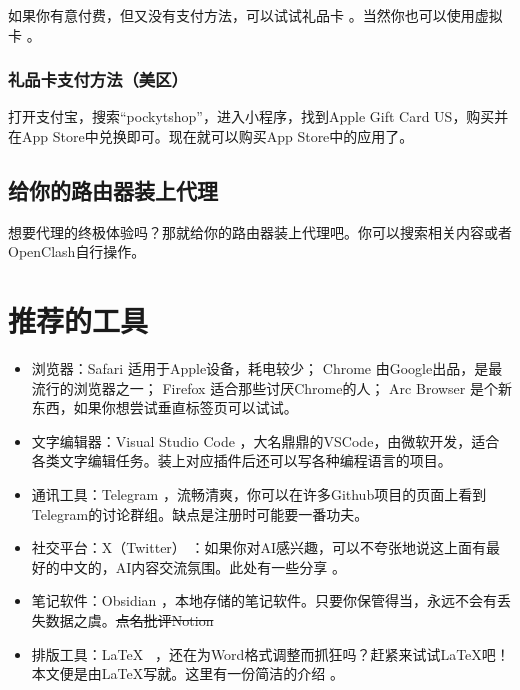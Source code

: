 如果你有意付费，但又没有支付方法，可以试试礼品卡 \hyperlink{gift-card}{} 。当然你也可以使用虚拟卡 \hyperlink{card}{} 。
\hypertarget{gift-card}{\subsubsection*{礼品卡支付方法（美区）}}
打开支付宝，搜索“\textsf{pockytshop}”，进入小程序，找到\textsf{Apple Gift Card US}，购买并在\textsf{App Store}中兑换即可。现在就可以购买\textsf{App Store}中的应用了。

\subsection{给你的路由器装上代理}
想要代理的终极体验吗？那就给你的路由器装上代理吧。你可以搜索相关内容或者\textsf{OpenClash}自行操作。

\section{推荐的工具}
\begin{itemize}
    \item 浏览器：\textsf{Safari} \href{https://www.apple.com/safari/}{\color{black}\faLink} 适用于\textsf{Apple}设备，耗电较少；
    \textsf{Chrome} \href{https://www.google.com/chrome/}{\color{black}\faLink} 由\textsf{Google}出品，是最流行的浏览器之一；
    \textsf{Firefox} \href{https://www.mozilla.org/en-US/firefox/}{\color{black}\faLink} 适合那些讨厌\textsf{Chrome}的人；
    \textsf{Arc Browser} \href{https://arc.net}{\color{black}\faLink} 是个新东西，如果你想尝试垂直标签页可以试试。
    \item 文字编辑器：\textsf{Visual Studio Code} \href{https://code.visualstudio.com}{\color{black}\faLink} ，大名鼎鼎的\textsf{VSCode}，由微软开发，适合各类文字编辑任务。装上对应插件后还可以写各种编程语言的项目。
    \item 通讯工具：\textsf{Telegram} \href{https://telegram.org}{\color{black}\faLink} ，流畅清爽，你可以在许多\textsf{Github}项目的页面上看到\textsf{Telegram}的讨论群组。缺点是注册时可能要一番功夫。
    \item 社交平台：\textsf{X（Twitter）} \href{https://x.com/}{\color{black}\faLink} ：如果你对AI感兴趣，可以不夸张地说这上面有最好的中文的，AI内容交流氛围。此处有一些分享 \href{https://www.aisourcehub.info}{\color{black}\faLink}。
    \item 笔记软件：\textsf{Obsidian} \href{https://obsidian.md}{\color{black}\faLink} ，本地存储的笔记软件。只要你保管得当，永远不会有丢失数据之虞。\sout{点名批评Notion}
    \item 排版工具：\LaTeX\ \href{https://www.latex-project.org}{\color{black}\faLink} ，还在为Word格式调整而抓狂吗？赶紧来试试\LaTeX 吧！本文便是由\LaTeX 写就。这里有一份简洁的介绍 \href{https://github.com/stone-zeng/latex-talk}{\color{black}\faLink}。
\end{itemize}
